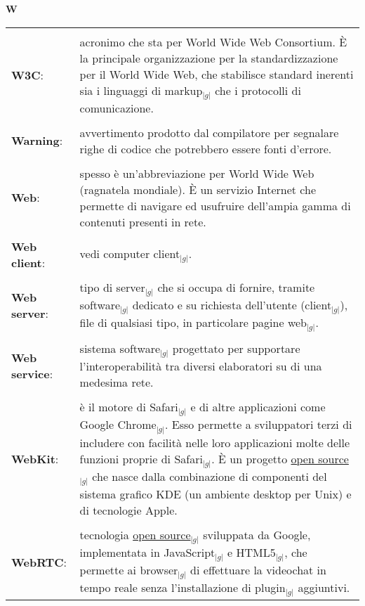 \hfill\Huge{\textbf{W}}\\
\normalsize
\label{tabVers}
	\begin{longtable}{p{} p{}} 
	    \toprule
	    \\
	    \textbf{W3C}:		&	acronimo che sta per World Wide Web Consortium. \`E la principale organizzazione per la standardizzazione per il World Wide Web, che stabilisce standard inerenti sia i linguaggi di markup$_{|g|}$ che i protocolli di comunicazione.\\
	    \\
	    \textbf{Warning}:		&	avvertimento prodotto dal compilatore per segnalare righe di codice che potrebbero essere fonti d’errore.\\
	    \\
	    \textbf{Web}:		&	spesso è un’abbreviazione per World Wide Web (ragnatela mondiale). \`E un servizio Internet che permette di navigare ed usufruire dell’ampia gamma di contenuti presenti in rete.\\
	    \\
	    \textbf{Web client}:	&	vedi computer client$_{|g|}$.\\
	    \\
	    \textbf{Web server}:	&	tipo di server$_{|g|}$ che si occupa di fornire, tramite software$_{|g|}$ dedicato e su richiesta dell’utente (client$_{|g|}$), file di qualsiasi tipo, in particolare pagine web$_{|g|}$.\\
	    \\
	    \textbf{Web service}: 	&	sistema software$_{|g|}$ progettato per supportare l’interoperabilità tra diversi elaboratori su di una medesima rete.\\
	    \\
	    \textbf{WebKit}:		&	è il motore di Safari$_{|g|}$ e di altre applicazioni come Google Chrome$_{|g|}$. Esso permette a sviluppatori terzi di includere con facilità nelle loro applicazioni molte delle funzioni proprie di Safari$_{|g|}$. 
						\`E un progetto \underline{open source}$_{|g|}$ che nasce dalla combinazione di componenti del sistema grafico KDE (un ambiente desktop per Unix) e di tecnologie Apple.\\
	    \\
	    \textbf{WebRTC}:		&	tecnologia \underline{open source}$_{|g|}$ sviluppata da Google, implementata in JavaScript$_{|g|}$ e HTML5$_{|g|}$, che permette ai browser$_{|g|}$ di effettuare la videochat in tempo reale senza l’installazione di plugin$_{|g|}$ aggiuntivi.\\

\end{longtable}
